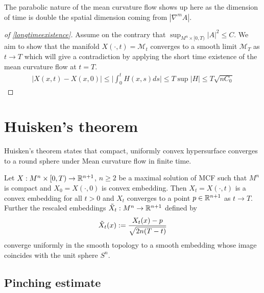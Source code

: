 \begin{remark}
    The parabolic nature of the mean curvature flow shows up here as the dimension of time is double the spatial dimension coming from $ |\nabla^{m}A| $.
\end{remark}
\begin{proof}[ of \cref{longtimeexistence}]
    Assume on the contrary that $ \sup_{M^{n} \times [0, T)}|A|^{2} \le C $. We aim to show that the manifold $X(\cdot, t)= \mathcal{M}_{t} $ converges to a smooth limit $ \mathcal{M}_{T} $ as $ t \to T $ which will give a contradiction by applying the short time existence of the mean curvature flow at $ t  = T $. \begin{align*}
        |X(x,t)-X(x,0)| \le  \bigg|\int_{0}^{t} H(x,s) ds \bigg| \le T \sup |H| \le T \sqrt{nC_{0}}
    \end{align*}
\end{proof}










\section{Huisken's theorem}

Huisken's theorem states that compact, uniformly convex hypersurface converges to a round sphere under Mean curvature flow in finite time. 
\begin{thm}
Let $ X: M^{n} \times [0, T) \to \mathbb{R}^{n+1}  $, $ n \ge 2 $ be a maximal solution of MCF such that $ M^{n} $ is compact and $X_{0} = X(\cdot, 0)$ is convex embedding. Then $ X_{t} = X(\cdot,t) $ is a convex embedding for all $ t>0 $ and $ X_{t} $ converges to a point $ p \in \mathbb{R}^{n+1} $ as $ t \to T $. Further the rescaled embeddings $ \tilde{X}_{t} : M^{n} \to \mathbb{R}^{n+1} $ defined by 
            \[ \tilde{X}_{t}(x) := \frac{X_{t}(x)-p}{\sqrt{2n(T-t)}}\]
converge uniformly in the smooth topology to a smooth embedding whose image coincides with the unit sphere $ S^{n} $.
\end{thm}
\subsection{Pinching estimate}

